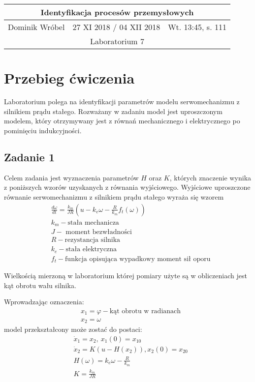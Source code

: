 \documentclass[a4paper,15pt]{article}
\begin{document}

\begin{table}
\begin{center}
\begin{tabular}{|l|l|l|}
\hline
\multicolumn{3}{|c|}{\textbf{Identyfikacja procesów przemysłowych}} \\ \hline Dominik Wróbel & 27 XI 2018 / 04 XII 2018 & Wt. 13:45, s. 111 \\ \hline
\multicolumn{3}{|c|}{Laboratorium 7} \\ \hline 
\end{tabular}
\end{center}
\end{table}


\section{Przebieg ćwiczenia}

Laboratorium polega na identyfikacji parametrów modelu serwomechanizmu z silnikiem prądu stałego. Rozważany w zadaniu model jest uproszczonym modelem, który otrzymywany jest z równań mechanicznego i elektrycznego po pominięciu indukcyjności.
  
\subsection{Zadanie 1 }
Celem zadania jest wyznaczenia parametrów \( H \) oraz \( K \), których znaczenie wynika z poniższych wzorów uzyskanych z równania wyjściowego. 
Wyjściowe uproszczone równanie serwomechanizmu z silnikiem prądu stałego wyraża się wzorem
\begin{align*}
& \frac{d\omega}{dt} = \frac{k_m}{JR}(u-k_e\omega -\frac{R}{k_m}f_t(\omega)) \\
& k_m - \text{stała mechanicza} \\
& J - \text{ moment bezwładności } \\
& R - \text{rezystancja silnika} \\
& k_e - \text{stała elektryczna} \\
& f_t - \text{funkcja opisująca wypadkowy moment sił oporu}
\end{align*}

Wielkością mierzoną w laboratorium której pomiary użyte są w obliczeniach jest kąt obrotu wału silnika. 

Wprowadzając oznaczenia:
\begin{align*}
& x_1 = \varphi  - \text{kąt obrotu w radianach} \\
& x_2 = \omega
\end{align*}
model przekształcony może zostać do postaci:
\begin{align*}
& \dot{x}_1 = x_2, \ x_1(0)=x_{10} \\
& \dot{x}_2 = K(u-H(x_2)), x_2(0)=x_{20} \\
& H(\omega) = k_e\omega-\frac{R}{k_m} \\
& K = \frac{k_m}{JR}
\end{align*}
\end{document}
